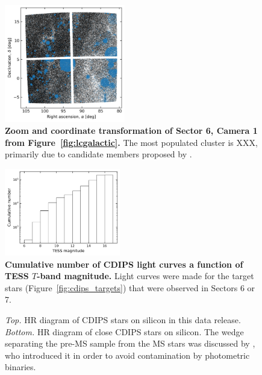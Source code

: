 \documentclass[12pt,twocolumn,tighten]{aastex62}
\begin{document}
\begin{figure}[!t]
	\begin{center}
		\leavevmode
		\includegraphics[width=0.47\textwidth]{sector6_cam[1]_ccd[1-2-3-4]cluster_field_star_positions.png}
	\end{center}
	\vspace{-0.5cm}
	\caption{
		{\bf  Zoom and coordinate transformation
			of Sector 6, Camera 1 from Figure~\ref{fig:lcgalactic}.}
		The most populated cluster is XXX, primarily due to candidate
		members proposed by \citet{dias_proper_2014}.
		\label{fig:lcradeczoom}
	}
\end{figure}


\begin{figure}[!t]
	\begin{center}
		\leavevmode
		\includegraphics[width=0.45\textwidth]{cdf_T_mag.png}
	\end{center}
	\vspace{-0.5cm}
	\caption{
    {\bf Cumulative number of CDIPS light curves a function of TESS
    $T$-band magnitude.}  Light curves were made for the
    target stars (Figure~\ref{fig:cdips_targets}) that were observed
    in Sectors 6 or 7.
		\label{fig:cdf_T_mag}
	}
\end{figure}

\begin{figure}[!ht]
	\vspace{-0.8cm}
	\vspace{-0.8cm}
	\caption{
    {\it Top.} HR diagram of CDIPS stars on silicon in this
    data release.  {\it Bottom.} HR diagram of close CDIPS stars on
    silicon. The wedge separating the pre-MS sample from the MS
    stars was discussed by \citet{zari_3d_2018}, who introduced it in
    order to avoid contamination by photometric binaries.
	}
	\label{fig:hrd}
\end{figure}
\end{document}
